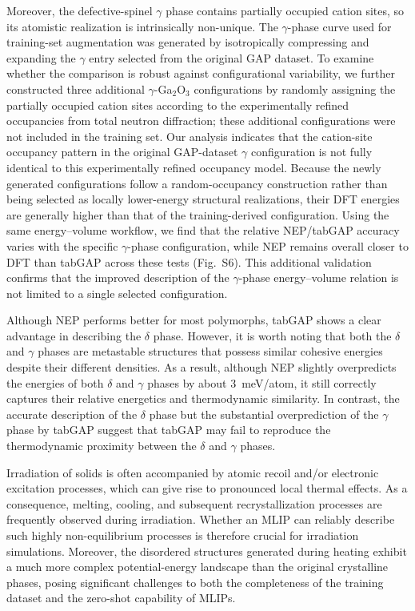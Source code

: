 \documentclass[aip,graphicx,amsmath,amssymb]{revtex4-1}
\begin{document}
Moreover, the defective-spinel $\gamma$ phase contains partially occupied cation sites, so its
atomistic realization is intrinsically non-unique.
The $\gamma$-phase curve used for training-set augmentation was generated by isotropically
compressing and expanding the $\gamma$ entry selected from the original GAP dataset.
To examine whether the comparison is robust against configurational variability, we further
constructed three additional $\gamma$-Ga$_2$O$_3$ configurations by randomly assigning the
partially occupied cation sites according to the experimentally refined occupancies from
total neutron diffraction\cite{playford_structures_2013};
these additional configurations were not included in the training set.
Our analysis indicates that the cation-site occupancy pattern in the original GAP-dataset
$\gamma$ configuration is not fully identical to this experimentally refined occupancy model.
Because the newly generated configurations follow a random-occupancy construction rather than
being selected as locally lower-energy structural realizations, their DFT energies are generally
higher than that of the training-derived configuration.
Using the same energy--volume workflow, we find that the relative NEP/tabGAP accuracy varies
with the specific $\gamma$-phase configuration, while NEP remains overall closer to DFT than
tabGAP across these tests (Fig.~S6).
This additional validation confirms that the improved description of the $\gamma$-phase
energy--volume relation is not limited to a single selected configuration.

Although NEP performs better for most polymorphs, tabGAP shows a clear advantage in
describing the $\delta$ phase.
However, it is worth noting that both the $\delta$ and $\gamma$ phases are 
metastable structures that possess similar cohesive energies despite their different densities.
As a result, although NEP slightly overpredicts the energies of both $\delta$ and $\gamma$
phases by about 3~meV/atom, it still correctly captures their relative energetics and
thermodynamic similarity.
In contrast, the accurate description of the $\delta$ phase but the substantial
overprediction of the $\gamma$ phase by tabGAP suggest that tabGAP may fail to reproduce
the thermodynamic proximity between the $\delta$ and $\gamma$ phases.

Irradiation of solids is often accompanied by atomic recoil and/or electronic excitation
processes, which can give rise to pronounced local thermal effects.
As a consequence, melting, cooling, and subsequent recrystallization processes are
frequently observed during irradiation.
Whether an MLIP can reliably describe such highly non-equilibrium processes is therefore
crucial for irradiation simulations.
Moreover, the disordered structures generated during heating exhibit a much more complex
potential-energy landscape than the original crystalline phases, posing significant
challenges to both the completeness of the training dataset and the zero-shot capability
of MLIPs.
\end{document}
